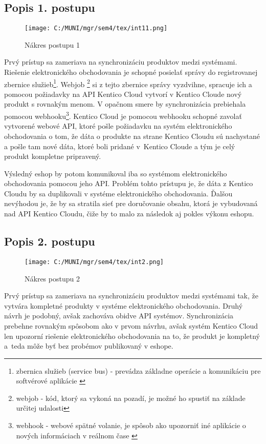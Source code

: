\documentclass[
  printed, %
  table,   %
  lof,     %
  nolot,     %
  twoside,  
]{fithesis3}
\begin{document}
\subsection{Popis 1. postupu}
\begin{figure}[h]
  \begin{center}
        \texttt{[image: C:/MUNI/mgr/sem4/tex/int11.png]}
  \end{center}
  \caption{Nákres postupu 1}
  \label{fig:integraation1}
\end{figure}
Prvý prístup sa zameriava na synchronizáciu produktov medzi systémami. Riešenie elektronického obchodovania je schopné posielať správy do registrovanej zbernice služieb\footnote{zbernica služieb (service bus) - prevádza základne operácie a komunikáciu pre softvérové aplikácie \cite{sb}}. Webjob \footnote{webjob - kód, ktorý sa vykoná na pozadí, je možné ho spustiť na základe určitej udalosti} si z tejto zbernice správy vyzdvihne, spracuje ich a pomocou požiadavky na API Kentico Cloud vytvorí v Kentico Cloude nový produkt s rovnakým menom. V opačnom smere by synchronizácia prebiehala pomocou webhooku\footnote{webhook - webové spätné volanie, je spôsob ako upozorniť iné aplikácie o nových informáciach v reálnom čase \cite{webhook}}. Kentico Cloud je pomocou webhooku  schopné zavolať vytvorené webové API, ktoré pošle požiadavku na systém elektronického obchodovania o tom, že dáta o produkte na strane Kentico Cloudu sú nachystané a pošle tam nové dáta, ktoré boli pridané v~Kentico Cloude a tým je celý produkt kompletne pripravený.

Výsledný eshop by potom komunikoval iba so systémom elektronického obchodovania pomocou jeho API. Problém tohto prístupu je, že dáta z  Kentico Cloudu by sa duplikovali v systéme elektronického obchodovania. Ďalšou nevýhodou je, že by sa stratila sieť pre doručovanie obsahu, ktorá je vybudovaná nad API Kentico Cloudu, čiže by to malo za následok aj pokles výkonu eshopu. 

\subsection{Popis 2. postupu}
\begin{figure}[h]
  \begin{center}
        \texttt{[image: C:/MUNI/mgr/sem4/tex/int2.png]}
  \end{center}
  \caption{Nákres postupu 2}
  \label{fig:integration2}
\end{figure}
Prvý prístup sa zameriava na synchronizáciu produktov medzi systémami tak, že vytvára kompletné produkty v systéme elektronického obchodovania.  Druhý návrh je podobný, avšak zachováva obidve API systémov. Synchronizácia prebehne rovnakým spôsobom ako v prvom návrhu, avšak systém Kentico Cloud len upozorní riešenie elektronického obchodovania na to, že produkt je kompletný a~teda môže byť bez probémov publikovaný v eshope.
\end{document}
